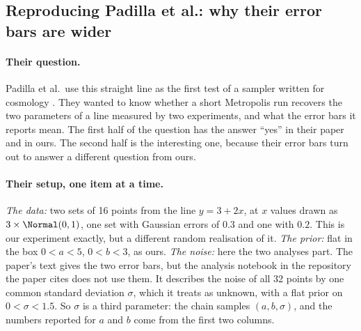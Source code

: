 \subsection{Reproducing Padilla et al.: why their error bars are wider}
\label{9c:sec:line-padilla}

\paragraph{Their question.} Padilla et al.\ use this straight line as the first test of a sampler written for
cosmology . They wanted to know whether a short Metropolis run recovers the two
parameters of a line measured by two experiments, and what the error bars it reports mean. The first half of
the question has the answer ``yes'' in their paper and in ours. The second half is the interesting one,
because their error bars turn out to answer a different question from ours.

\paragraph{Their setup, one item at a time.} \emph{The data:} two sets of 16 points from the line $y=3+2x$, at
$x$ values drawn as $3\times\Normal(0,1)$, one set with Gaussian errors of $0.3$ and one with $0.2$. This is
our experiment exactly, but a different random realisation of it. \emph{The prior:} flat in the box $0<a<5$,
$0<b<3$, as ours. \emph{The noise:} here the two analyses part. The paper's text gives the two error bars,
but the analysis notebook in the repository the paper cites does not use them. It describes the noise of all
32 points by one common standard deviation $\sigma$, which it treats as unknown, with a flat prior on
$0<\sigma<1.5$. So $\sigma$ is a third parameter: the chain samples $(a,b,\sigma)$, and the numbers reported
for $a$ and $b$ come from the first two columns.

